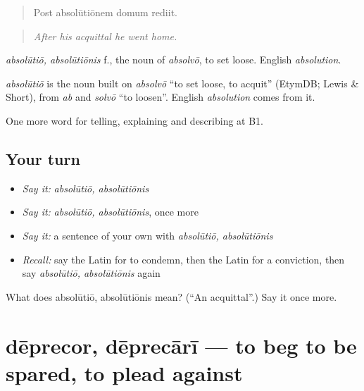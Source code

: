 \begin{quote}
Post absolūtiōnem domum rediit.
\end{quote}

\begin{quote}
\emph{After his acquittal he went home.}
\end{quote}

\emph{absolūtiō, absolūtiōnis} f., the noun of \emph{absolvō}, to set loose. English \emph{absolution}.

\begin{cousinweb}
\emph{absolūtiō} is the noun built on \emph{absolvō} \textquotedblleft{}to set loose, to acquit\textquotedblright{} (EtymDB; Lewis \& Short), from \emph{ab} and \emph{solvō} \textquotedblleft{}to loosen\textquotedblright{}. English \emph{absolution} comes from it.
\end{cousinweb}

\begin{grammarlens}[title={What you've built}]
One more word for telling, explaining and describing at B1.
\end{grammarlens}

\subsection*{Your turn}
\begin{itemize}
\raggedright
  \item \emph{Say it:} \emph{absolūtiō, absolūtiōnis}
  \item \emph{Say it:} \emph{absolūtiō, absolūtiōnis}, once more
  \item \emph{Say it:} a sentence of your own with \emph{absolūtiō, absolūtiōnis}
  \item \emph{Recall:} say the Latin for to condemn, then the Latin for a conviction, then say \emph{absolūtiō, absolūtiōnis} again
\end{itemize}

\begin{tcolorbox}[breakable,colback=teal!4,colframe=teal!35!black,title={Before you move on}]
What does absolūtiō, absolūtiōnis mean? (\textquotedblleft{}An acquittal\textquotedblright{}.) Say it once more.
\end{tcolorbox}
\section[dēprecor, dēprecārī]{dēprecor, dēprecārī — to beg to be spared, to plead against}

